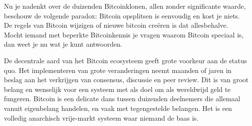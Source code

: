 Nu je nadenkt over de duizenden Bitcoinklonen, allen zonder significante waarde, beschouw de volgende paradox: Bitcoin opsplitsen is eenvoudig en kost je niets. De regels van Bitcoin wijzigen of nieuwe bitcoin creëren is dat allesbehalve. Mocht iemand met beperkte Bitcoinkennis je vragen waarom Bitcoin speciaal is, dan weet je nu wat je kunt antwoorden.

De decentrale aard van het Bitcoin ecosysteem geeft grote voorkeur aan de status quo. Het implementeren van grote veranderingen neemt maanden of jaren in beslag aan het verkrijgen van consensus, discussie en peer review. Dit is van groot belang en wenselijk voor een systeem met als doel om als wereldwijd geld te fungeren. Bitcoin is een delicate dans tussen duizenden deelnemers die allemaal vanuit eigenbelang handelen, en vaak met tegengestelde belangen. Het is een volledig anarchisch vrije-markt systeem waar niemand de baas is. 

